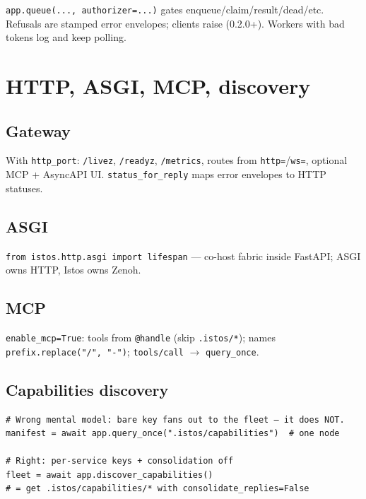 \documentclass[11pt,a4paper]{article}
\begin{document}
\texttt{app.queue(..., authorizer=...)} gates enqueue/claim/result/dead/etc.
Refusals are stamped error envelopes; clients raise (0.2.0+). Workers with bad
tokens log and keep polling.

\section{HTTP, ASGI, MCP, discovery}

\subsection{Gateway}

With \texttt{http\_port}: \texttt{/livez}, \texttt{/readyz}, \texttt{/metrics},
routes from \texttt{http=}/\texttt{ws=}, optional MCP + AsyncAPI UI.
\texttt{status\_for\_reply} maps error envelopes to HTTP statuses.

\subsection{ASGI}

\texttt{from istos.http.asgi import lifespan} --- co-host fabric inside FastAPI;
ASGI owns HTTP, Istos owns Zenoh.

\subsection{MCP}

\texttt{enable\_mcp=True}: tools from \texttt{@handle} (skip \texttt{.istos/*});
names \texttt{prefix.replace("/", "-")}; \texttt{tools/call} $\to$
\texttt{query\_once}.

\subsection{Capabilities discovery}

\begin{lstlisting}
# Wrong mental model: bare key fans out to the fleet — it does NOT.
manifest = await app.query_once(".istos/capabilities")  # one node

# Right: per-service keys + consolidation off
fleet = await app.discover_capabilities()
# = get .istos/capabilities/* with consolidate_replies=False
\end{lstlisting}
\end{document}
